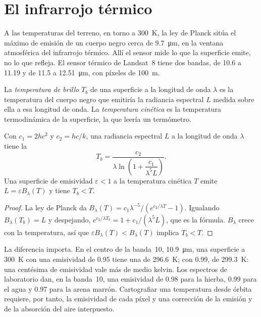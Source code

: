 \section{El infrarrojo térmico}\label{sec:b3:remote-sensing-gis:thermal}

A las temperaturas del terreno, en torno a \qty{300}{K}, la ley de Planck sitúa
el máximo de emisión de un cuerpo negro cerca de \qty{9.7}{\micro\metre}, en la
ventana atmosférica del infrarrojo térmico. Allí el sensor mide lo que
la superficie emite, no lo que refleja. El sensor térmico de Landsat~8
tiene dos bandas, de 10.6 a 11.19 y de 11.5 a \qty{12.51}{\micro\metre}, con
píxeles de \qty{100}{m}.

\begin{definition}\label{def:b3:remote-sensing-gis:brightness}
La \emph{temperatura de brillo} $T_b$ de una
superficie a la longitud de onda $\lambda$ es la temperatura del cuerpo negro
que emitiría la radiancia espectral $L$ medida sobre ella a esa
longitud de onda. La \emph{temperatura cinética} es la temperatura termodinámica
de la superficie, la que leería un termómetro.
\end{definition}

\begin{proposition}\label{prop:b3:remote-sensing-gis:planck-inversion}
Con $c_1 = 2hc^2$ y $c_2 = hc/k$, una radiancia espectral $L$ a la
longitud de onda $\lambda$ tiene la 
\[
T_b = \frac{c_2}{\lambda \ln\!\left(1 + \dfrac{c_1}{\lambda^5 L}\right)} .
\]
Una superficie de emisividad $\varepsilon < 1$ a la temperatura cinética $T$
emite $L = \varepsilon B_\lambda(T)$ y tiene $T_b < T$.
\end{proposition}

\begin{proof}
La ley de Planck da $B_\lambda(T) = c_1\lambda^{-5}/(e^{c_2/\lambda T} -
1)$. Igualando $B_\lambda(T_b) = L$ y despejando, $e^{c_2/\lambda T_b} = 1 +
c_1/(\lambda^5L)$, que es la fórmula. $B_\lambda$ crece con la
temperatura, así que $\varepsilon B_\lambda(T) < B_\lambda(T)$ implica $T_b < T$.
\end{proof}

La diferencia importa. En el centro de la banda~10, \qty{10.9}{\micro\metre},
una superficie a \qty{300}{K} con una emisividad de 0.95 tiene una 
de \qty{296.6}{K}; con 0.99, de \qty{299.3}{K}: una centésima de
emisividad vale más de medio kelvin. Los espectros de laboratorio dan, en
la banda~10, una emisividad de 0.98 para la hierba, 0.99 para el agua y
0.97 para la arena marrón. Cartografiar una temperatura desde órbita requiere, por tanto,
la emisividad de cada píxel y una corrección de la emisión y de la
absorción del aire interpuesto.

